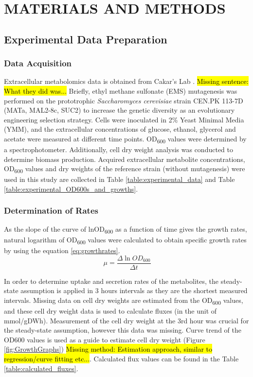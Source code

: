 \chapter{MATERIALS AND METHODS}

\section{Experimental Data Preparation}
\subsection{Data Acquisition}
Extracellular metabolomics data is obtained from Cakar's Lab \cite{arslan2018physiological}. \hl{Missing sentence: What they did was...} Briefly, ethyl methane sulfonate (EMS) mutagenesis was performed on the prototrophic \emph{Saccharomyces cerevisiae} strain CEN.PK 113-7D (MATa, MAL2-8c, SUC2) to increase the genetic diversity as an evolutionary engineering selection strategy. Cells were inoculated in 2\% Yeast Minimal Media (YMM), and the extracellular concentrations of glucose, ethanol, glycerol and acetate were measured at different time points. OD\textsubscript{600} values were determined by a spectrophotometer. Additionally, cell dry weight analysis was conducted to determine biomass production. Acquired extracellular metabolite concentrations, OD\textsubscript{600} values and dry weights of the reference strain (without mutagenesis) were used in this study are collected in Table \ref{table:experimental_data} and Table \ref{table:experimental_OD600s_and_growths}.




\subsection{Determination of Rates}
As the slope of the curve of lnOD\textsubscript{600} as a function of time gives the growth rates, natural logarithm of OD\textsubscript{600} values were calculated to obtain specific growth rates by using the equation \ref{eq:growthrates}.
  \begin{equation}
      \ \mu = \frac{\Delta \ln{OD_{600}}}{\Delta t}
      \label{eq:growthrates}
  \end{equation}

In order to determine uptake and secretion rates of the metabolites, the steady-state assumption is applied in 3 hours intervals as they are the shortest measured intervals. Missing data on cell dry weights are estimated from the OD\textsubscript{600} values, and these cell dry weight data is used to calculate fluxes (in the unit of mmol/gDWh). Measurement of the cell dry weight at the 3rd hour was crucial for the steady-state assumption, however this data was missing. Curve trend of the OD600 values is used as a guide to estimate cell dry weight (Figure \ref{fig:GrowthGraphs}) \hl{Missing method: Estimation approach, similar to regression/curve fitting etc...}. Calculated flux values can be found in the Table \ref{table:calculated_fluxes}.

